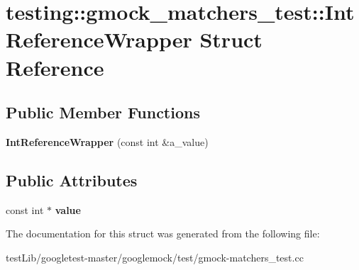 \hypertarget{structtesting_1_1gmock__matchers__test_1_1IntReferenceWrapper}{}\section{testing\+:\+:gmock\+\_\+matchers\+\_\+test\+:\+:Int\+Reference\+Wrapper Struct Reference}
\label{structtesting_1_1gmock__matchers__test_1_1IntReferenceWrapper}
\subsection*{Public Member Functions}
\begin{DoxyCompactItemize}
\item 
\mbox{\label{structtesting_1_1gmock__matchers__test_1_1IntReferenceWrapper_a9094df655096520977e13d620fbf7be7}} 
{\bfseries Int\+Reference\+Wrapper} (const int \&a\+\_\+value)
\end{DoxyCompactItemize}
\subsection*{Public Attributes}
\begin{DoxyCompactItemize}
\item 
\mbox{\label{structtesting_1_1gmock__matchers__test_1_1IntReferenceWrapper_ac8fcb05733aa1fdb6c5236731b236cf6}} 
const int $\ast$ {\bfseries value}
\end{DoxyCompactItemize}


The documentation for this struct was generated from the following file\+:\begin{DoxyCompactItemize}
\item 
test\+Lib/googletest-\/master/googlemock/test/gmock-\/matchers\+\_\+test.\+cc\end{DoxyCompactItemize}
